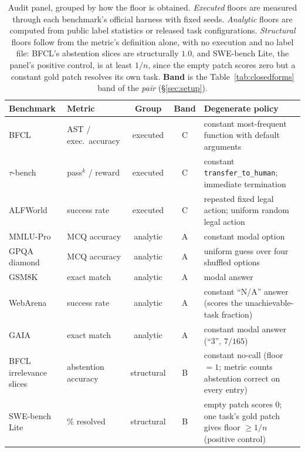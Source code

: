 \documentclass{article}
\theoremstyle{plain}
\theoremstyle{definition}
\begin{document}
\begin{table}[t]
  \caption{Audit panel, grouped by how the floor is obtained. \emph{Executed} floors are measured through each benchmark's official harness with fixed seeds. \emph{Analytic} floors are computed from public label statistics or released task configurations. \emph{Structural} floors follow from the metric's definition alone, with no execution and no label file: BFCL's abstention slices are structurally $1.0$, and SWE-bench Lite, the panel's positive control, is at least $1/n$, since the empty patch scores zero but a constant gold patch resolves its own task. \textbf{Band} is the Table~\ref{tab:closedforms} band of the \emph{pair} (\S\ref{sec:setup}).}
  \label{tab:panel}
  \centering
  \small
  \setlength{\tabcolsep}{4pt}
  \begin{tabular}{llcc>{\raggedright\arraybackslash}p{3.1cm}}
    \toprule
    Benchmark & Metric & Group & Band & Degenerate policy \\
    \midrule
    BFCL \citep{patil2024bfcl} & AST / exec.\ accuracy & executed & C & constant most-frequent function with default arguments \\
    $\tau$-bench \citep{yao2024tau} & pass$^{k}$ / reward & executed & C & constant \texttt{transfer\_to\_human}; immediate termination \\
    ALFWorld \citep{shridhar2021alfworld} & success rate & executed & C & repeated fixed legal action; uniform random legal action \\
    \midrule
    MMLU-Pro \citep{wang2024mmlupro} & MCQ accuracy & analytic & A & constant modal option \\
    GPQA diamond \citep{rein2023gpqa} & MCQ accuracy & analytic & A & uniform guess over four shuffled options \\
    GSM8K \citep{cobbe2021gsm8k} & exact match & analytic & A & modal answer \\
    WebArena \citep{zhou2024webarena} & success rate & analytic & A & constant ``N/A'' answer (scores the unachievable-task fraction) \\
    GAIA \citep{mialon2023gaia} & exact match & analytic & A & constant modal answer (``3'', $7/165$) \\
    \midrule
    BFCL irrelevance slices & abstention accuracy & structural & B & constant no-call (floor $=1$; metric counts abstention correct on every entry) \\
    SWE-bench Lite \citep{jimenez2024swebench} & \% resolved & structural & B & empty patch scores $0$; one task's gold patch gives floor $\ge 1/n$ (positive control) \\
    \bottomrule
  \end{tabular}
\end{table}
\end{document}
